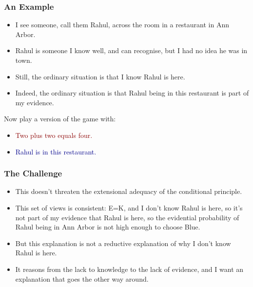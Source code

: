 \begin{frame}

\frametitle{An Example}
\label{anexample}

\begin{itemize}
\item I see someone, call them Rahul, across the room in a restaurant in Ann Arbor.

\item Rahul is someone I know well, and can recognise, but I had no idea he was in town.

\item Still, the ordinary situation is that I know Rahul is here.

\item Indeed, the ordinary situation is that Rahul being in this restaurant is part of my evidence.

\end{itemize}
Now play a version of the game with:

\begin{itemize}
\item \textcolor{darkred}{Two plus two equals four.}

\item \textcolor{darkblue}{Rahul is in this restaurant.}

\end{itemize}
\end{frame}

\begin{frame}

\frametitle{The Challenge}
\label{thechallenge}

\begin{itemize}
\item This doesn't threaten the extensional adequacy of the conditional principle.

\item This set of views is consistent: E=K, and I don't know Rahul is here, so it's not part of my evidence that Rahul is here, so the evidential probability of Rahul being in Ann Arbor is not high enough to choose Blue.

\item But this explanation is not a reductive explanation of why I don't know Rahul is here.

\item It reasons from the lack to knowledge to the lack of evidence, and I want an explanation that goes the other way around.

\end{itemize}
\end{frame}

